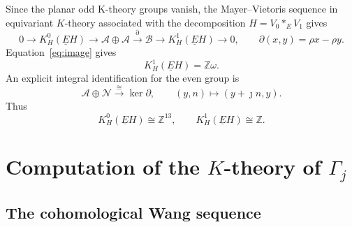 \documentclass[11pt]{amsart}
\newcommand{\Z}{\mathbb Z}
\newcommand{\KC}[2]{K^{#1}_{#2}(\underline E#2)}
\theoremstyle{remark}
\numberwithin{equation}{section}
\begin{document}
Since the planar odd K-theory groups vanish, the Mayer--Vietoris sequence in equivariant $K$-theory associated with the decomposition $H=V_0*_E V_1$ gives
\begin{equation}\label{eq:MV-H}
 0\longrightarrow\KC{0}{H}
 \longrightarrow\mathcal A\oplus\mathcal A
 \xrightarrow{\partial}\mathcal B
 \longrightarrow\KC{1}{H}\longrightarrow0,
 \qquad \partial(x,y)=\rho x-\rho y.
\end{equation}
Equation~\eqref{eq:image} gives
\[
 \KC{1}{H}=\Z\omega.
\]
An explicit integral identification for the even group is
\begin{equation}\label{eq:H-coordinates}
 \mathcal A\oplus\mathcal N\xrightarrow{\cong}\ker\partial,
 \qquad (y,n)\longmapsto(y+\jmath n,y).
\end{equation}
Thus
\begin{equation}\label{eq:H-results}
 \KC{0}{H}\cong\Z^{13},\qquad \KC{1}{H}\cong\Z.
\end{equation}
\section{Computation of the \texorpdfstring{$K$}{K}-theory of
\texorpdfstring{$\Gamma_j$}{Gamma j}}
\subsection{The cohomological Wang sequence}
\end{document}
